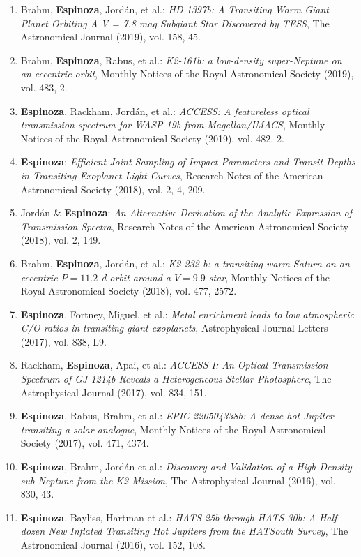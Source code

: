 \documentclass[12pt, a4paper]{article} %
\begin{document}
\begin{flushleft}
\begin{enumerate}
\item Brahm, \textbf{Espinoza}, Jord\'an, et al.: \textit{HD 1397b: A Transiting Warm Giant Planet Orbiting A V = 7.8 mag Subgiant Star Discovered by TESS}, The Astronomical Journal (2019), vol. 158, 45.
\item Brahm, \textbf{Espinoza}, Rabus, et al.: \textit{K2-161b: a low-density super-Neptune on an eccentric orbit}, Monthly Notices of the Royal Astronomical Society (2019), vol. 483, 2.
\item \textbf{Espinoza}, Rackham, Jord\'an, et al.: \textit{ACCESS: A featureless optical transmission spectrum for WASP-19b from Magellan/IMACS}, Monthly Notices of the Royal Astronomical Society (2019), vol. 482, 2.
\item \textbf{Espinoza}: \textit{Efficient Joint Sampling of Impact Parameters and Transit Depths in Transiting Exoplanet Light Curves}, Research Notes of the American Astronomical Society (2018), vol. 2, 4, 209.
\item Jord\'an \& \textbf{Espinoza}: \textit{An Alternative Derivation of the Analytic Expression of Transmission Spectra}, Research Notes of the American Astronomical Society (2018), vol. 2, 149.
\item Brahm, \textbf{Espinoza}, Jord\'an, et al.: \textit{K2-232 b: a transiting warm Saturn on an eccentric $P = 11.2$ d orbit around a $V = 9.9$ star}, Monthly Notices of the Royal Astronomical Society (2018), vol. 477, 2572.
\item \textbf{Espinoza}, Fortney, Miguel, et al.: \textit{Metal enrichment leads to low atmospheric C/O ratios in transiting giant exoplanets}, Astrophysical Journal Letters (2017), vol. 838, L9.
\item Rackham, \textbf{Espinoza}, Apai, et al.: \textit{ACCESS I: An Optical Transmission Spectrum of GJ 1214b Reveals a Heterogeneous Stellar Photosphere}, The Astrophysical Journal (2017), vol. 834, 151.
\item \textbf{Espinoza}, Rabus, Brahm, et al.: \textit{EPIC 220504338b: A dense hot-Jupiter transiting a solar analogue}, Monthly Notices of the Royal Astronomical Society (2017), vol. 471, 4374.
\item \textbf{Espinoza}, Brahm, Jord\'an et al.: \textit{Discovery and Validation of a High-Density sub-Neptune from the K2 Mission}, The Astrophysical Journal (2016), vol. 830, 43.
\item \textbf{Espinoza}, Bayliss, Hartman et al.: \textit{HATS-25b through HATS-30b: A Half-dozen New Inflated Transiting Hot Jupiters from the HATSouth Survey}, The Astronomical Journal (2016), vol. 152, 108.

\end{enumerate}
\end{flushleft}
\end{document}

